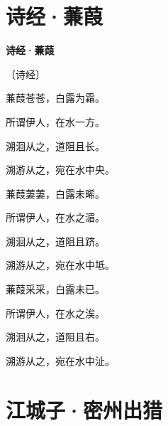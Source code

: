 \documentclass[12pt,UTF-8,openany,fontset=none]{ctexbook}
\begin{document}
\vspace{8pt}
\clearpage

\section{诗经·蒹葭}


\begin{center}
    {\bfseries 诗经·蒹葭}

    \vspace{18pt}

    \begin{large}\xuwen
        〔诗经〕
    \end{large}

\end{center}

    \vspace{18pt}  %

\begin{center}
    \begin{Large}

        蒹葭苍苍，白露为霜。

        所谓伊人，在水一方。

        溯洄从之，道阻且长。

        溯游从之，宛在水中央。

        \vspace{18pt}  %

        蒹葭萋萋，白露未晞。

        所谓伊人，在水之湄。

        溯洄从之，道阻且跻。

        溯游从之，宛在水中坻。

        \vspace{18pt}  %

        蒹葭采采，白露未已。

        所谓伊人，在水之涘。

        溯洄从之，道阻且右。

        溯游从之，宛在水中沚。

    \end{Large}

\end{center}

\vspace{8pt}
\clearpage

\section{江城子·密州出猎}
\end{document}
